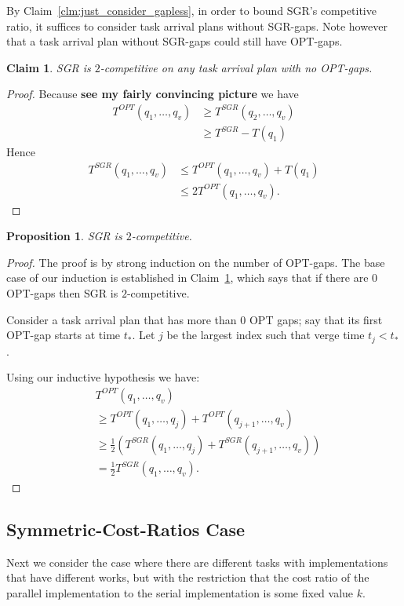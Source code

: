 \documentclass[twocolumn]{article}[10pt]
\newcommand{\paren}[1]{\left( #1 \right)}
\newtheorem{proposition}{Proposition}
\newtheorem{clm}{Claim}
\begin{document}
By Claim~\ref{clm:just_consider_gapless}, in order to bound SGR's
competitive ratio, it suffices to consider task arrival plans
without SGR-gaps. Note however that a task arrival plan without
SGR-gaps could still have OPT-gaps.

\begin{clm}
  \label{clm:no_optgaps}
  SGR is $2$-competitive on any task arrival plan with no
  OPT-gaps.
\end{clm}
\begin{proof}
  Because \textbf{see my fairly convincing picture} we have
  \begin{align*}
    T^{OPT}(q_1, \ldots, q_{v}) &\ge T^{SGR}(q_2, \ldots, q_v) \\
  &\ge T^{SGR} - T(q_1)
  \end{align*}
  Hence
  \begin{align*}
    T^{SGR}(q_1, \ldots, q_v) &\le T^{OPT}(q_1, \ldots, q_v) + T(q_1) \\
                                   &\le 2T^{OPT}(q_1, \ldots, q_v).
  \end{align*}
\end{proof}

\begin{proposition}
  \label{prop:2competitive}
  SGR is $2$-competitive.
\end{proposition}
\begin{proof}
  The proof is by strong induction on the number of OPT-gaps. 
  The base case of our induction is established in
  Claim~\ref{clm:no_optgaps}, which says that if there are $0$
  OPT-gaps then SGR is $2$-competitive. 

  Consider a task arrival plan that has more than $0$ OPT gaps;
  say that its first OPT-gap starts at time $t_*$.
  Let $j$ be the largest index such that verge time $t_j <
  t_*$.

  Using our inductive hypothesis we have:
  \begin{align*}
  &T^{OPT}(q_1, \ldots, q_v) \\
  &\ge T^{OPT}(q_1, \ldots, q_j) + T^{OPT}(q_{j+1}, \ldots, q_{v})\\
  &\ge \frac{1}{2}\paren{T^{SGR}(q_1, \ldots, q_j) + T^{SGR}(q_{j+1}, \ldots, q_{v})}\\
  &=\frac{1}{2} T^{SGR}(q_1, \ldots, q_v).
  \end{align*}

\end{proof}


\subsection{Symmetric-Cost-Ratios Case}
\label{subsec:symmetriccostratio}
Next we consider the case where there are different tasks with
implementations that have different works, but with the
restriction that the cost ratio of the parallel implementation to
the serial implementation is some fixed value $k$.
\end{document}
